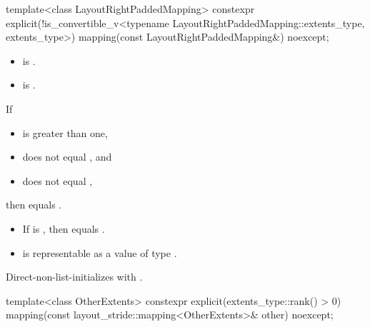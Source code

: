 %
\begin{itemdecl}
template<class LayoutRightPaddedMapping>
  constexpr explicit(!is_convertible_v<typename LayoutRightPaddedMapping::extents_type,
                                       extents_type>)
    mapping(const LayoutRightPaddedMapping&) noexcept;
\end{itemdecl}

\begin{itemdescr}
\pnum
\constraints
\begin{itemize}
\item
{}
is .
\item
{}
is .
\end{itemize}

\pnum
\mandates
If
\begin{itemize}
\item
{} is greater than one,
\item
{}
does not equal , and
\item
{}
does not equal ,
\end{itemize}
then  equals
.

\pnum
\expects
\begin{itemize}
\item
If  is ,
then \newline equals
.
\item
{} is representable as
a value of type .
\end{itemize}

\pnum
\effects
Direct-non-list-initializes  with .
\end{itemdescr}

%
\begin{itemdecl}
template<class OtherExtents>
 constexpr explicit(extents_type::rank() > 0)
    mapping(const layout_stride::mapping<OtherExtents>& other) noexcept;
\end{itemdecl}

